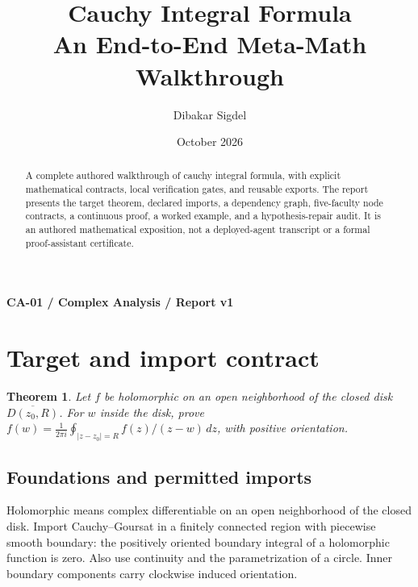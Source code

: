 \documentclass[preprint,12pt,aps,pra,showkeys,amsmath,amssymb,superscriptaddress,floatfix]{revtex4-2}
\newtheorem{theorem}{Theorem}[section]
\theoremstyle{definition}
\theoremstyle{remark}
\begin{document}
\title{Cauchy Integral Formula\\[4pt]\large An End-to-End Meta-Math Walkthrough}

\author{Dibakar Sigdel}


\date{October 2026}

\begin{abstract}

A complete authored walkthrough of cauchy integral formula, with
explicit mathematical contracts, local verification gates, and reusable
exports. The report presents the target theorem, declared imports, a
dependency graph, five-faculty node contracts, a continuous proof, a
worked example, and a hypothesis-repair audit. It is an authored
mathematical exposition, not a deployed-agent transcript or a formal
proof-assistant certificate.

\end{abstract}\maketitle\linespread{1.12}\selectfont

\noindent\textbf{CA-01 / Complex Analysis / Report v1}

\section{Target and import contract}

\begin{theorem}

Let \(f\) be holomorphic on an open neighborhood of the closed disk
\(\overline{D(z_0,R)}\). For \(w\) inside the disk, prove
\(f(w)=\frac1{2\pi i}\oint_{|z-z_0|=R}f(z)/(z-w)\,dz\), with positive
orientation.

\end{theorem}

\subsection{Foundations and permitted imports}

Holomorphic means complex differentiable on an open neighborhood of the
closed disk. Import Cauchy--Goursat in a finitely connected region with
piecewise smooth boundary: the positively oriented boundary integral of
a holomorphic function is zero. Also use continuity and the
parametrization of a circle. Inner boundary components carry clockwise
induced orientation.
\end{document}
